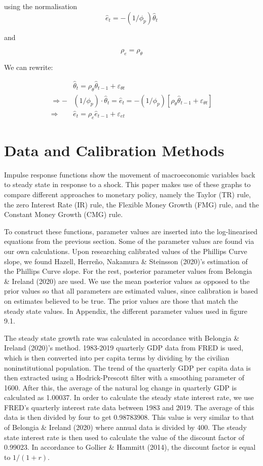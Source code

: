 \documentclass[11pt,preprint, authoryear]{elsarticle}
\numberwithin{equation}{section}
\numberwithin{figure}{section}
\numberwithin{table}{section}
\begin{document}
using the normalisation
\[\hat{e}_{t}=-\left(1 / \phi_{p}\right) \hat{\theta}_{t}\]

and

\[\rho_{e}=\rho_{\theta}\]

We can rewrite:

\[\begin{aligned}
&\hat{\theta}_{t}=\rho_{\theta} \hat{\theta}_{t-1}+\varepsilon_{\theta t}\\
\Rightarrow - & \left(1 / \phi_{p}\right) \cdot \hat{\theta}_{t} =  \hat{e}_t = -\left(1 / \phi_{p}\right) \left[ \rho_{\theta} \hat{\theta}_{t-1}+\varepsilon_{\theta t} \right]\\
\Rightarrow \quad &\hat{e}_t =  \rho_{e} \hat{e}_{t-1}+\varepsilon_{e t}
\end{aligned}\]

\newpage

\hypertarget{data-and-calibration-methods}{%
\section{Data and Calibration
Methods}\label{data-and-calibration-methods}}

Impulse response functions show the movement of macroeconomic variables
back to steady state in response to a shock. This paper makes use of
these graphs to compare different approaches to monetary policy, namely
the Taylor (TR) rule, the zero Interest Rate (IR) rule, the Flexible
Money Growth (FMG) rule, and the Constant Money Growth (CMG) rule.

To construct these functions, parameter values are inserted into the
log-linearised equations from the previous section. Some of the
parameter values are found via our own calculations. Upon researching
calibrated values of the Phillips Curve slope, we found Hazell, Herreño,
Nakamura \& Steinsson (2020)'s estimation of the Phillips Curve slope.
For the rest, posterior parameter values from Belongia \& Ireland (2020)
are used. We use the mean posterior values as opposed to the prior
values so that all parameters are estimated values, since calibration is
based on estimates believed to be true. The prior values are those that
match the steady state values. In Appendix, the different parameter
values used in figure 9.1.

The steady state growth rate was calculated in accordance with Belongia
\& Ireland (2020)'s method. 1983-2019 quarterly GDP data from FRED is
used, which is then converted into per capita terms by dividing by the
civilian noninstitutional population. The trend of the quarterly GDP per
capita data is then extracted using a Hodrick-Prescott filter with a
smoothing parameter of 1600. After this, the average of the natural log
change in quarterly GDP is calculated as 1.00037. In order to calculate
the steady state interest rate, we use FRED's quarterly interest rate
data between 1983 and 2019. The average of this data is then divided by
four to get 0.98783908. This value is very similar to that of Belongia
\& Ireland (2020) where annual data is divided by 400. The steady state
interest rate is then used to calculate the value of the discount factor
of 0.99023. In accordance to Gollier \& Hammitt (2014), the discount
factor is equal to \(1/(1+r)\).
\end{document}
